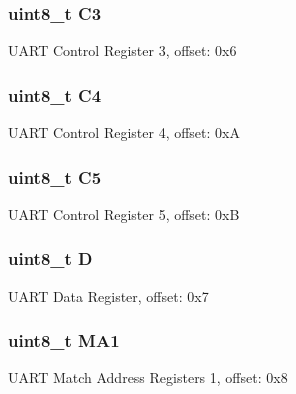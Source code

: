 \subsubsection[{C3}]{\setlength{\rightskip}{0pt plus 5cm}uint8\+\_\+t C3}\label{struct_u_a_r_t0___mem_map_a328e95cb4deb2dd724cb8b26a5ab381b}
U\+A\+R\+T Control Register 3, offset\+: 0x6 \hypertarget{struct_u_a_r_t0___mem_map_a9ecb3242c606bc219190b4cb4f64600f}{}
\subsubsection[{C4}]{\setlength{\rightskip}{0pt plus 5cm}uint8\+\_\+t C4}\label{struct_u_a_r_t0___mem_map_a9ecb3242c606bc219190b4cb4f64600f}
U\+A\+R\+T Control Register 4, offset\+: 0x\+A \hypertarget{struct_u_a_r_t0___mem_map_ac0242981a4c4bd9ccd00b67970943978}{}
\subsubsection[{C5}]{\setlength{\rightskip}{0pt plus 5cm}uint8\+\_\+t C5}\label{struct_u_a_r_t0___mem_map_ac0242981a4c4bd9ccd00b67970943978}
U\+A\+R\+T Control Register 5, offset\+: 0x\+B \hypertarget{struct_u_a_r_t0___mem_map_a42ede28e876dcdb2ce2ddd730de0401e}{}
\subsubsection[{D}]{\setlength{\rightskip}{0pt plus 5cm}uint8\+\_\+t D}\label{struct_u_a_r_t0___mem_map_a42ede28e876dcdb2ce2ddd730de0401e}
U\+A\+R\+T Data Register, offset\+: 0x7 \hypertarget{struct_u_a_r_t0___mem_map_a27a49a6c655e704d26523617e326b4b2}{}
\subsubsection[{M\+A1}]{\setlength{\rightskip}{0pt plus 5cm}uint8\+\_\+t M\+A1}\label{struct_u_a_r_t0___mem_map_a27a49a6c655e704d26523617e326b4b2}
U\+A\+R\+T Match Address Registers 1, offset\+: 0x8 \hypertarget{struct_u_a_r_t0___mem_map_adaf9bf1effbeb96d126fe9cf1bd0adb7}{}
